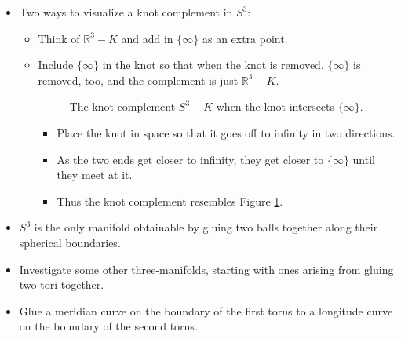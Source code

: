 \documentclass[titlepage]{article}
\numberwithin{figure}{section}
\numberwithin{table}{section}
\numberwithin{equation}{section}
\begin{document}
\begin{itemize}
    \item Two ways to visualize a knot complement in $S^3$:
    \begin{itemize}
        \item Think of $\mathbb{R}^3-K$ and add in $\{\infty\}$ as an extra point.
        \item Include $\{\infty\}$ in the knot so that when the knot is removed, $\{\infty\}$ is removed, too, and the complement is just $\mathbb{R}^3-K$.
        \begin{figure}[h!]
            \centering
            \caption{The knot complement $S^3-K$ when the knot intersects $\{\infty\}$.}
            \label{fig:knotinfty}
        \end{figure}
        \begin{itemize}
            \item Place the knot in space so that it goes off to infinity in two directions.
            \item As the two ends get closer to infinity, they get closer to $\{\infty\}$ until they meet at it.
            \item Thus the knot complement resembles Figure \ref{fig:knotinfty}.
        \end{itemize}
    \end{itemize}
    \item $S^3$ is the only manifold obtainable by gluing two balls together along their spherical boundaries.
    \item Investigate some other three-manifolds, starting with ones arising from gluing two tori together.
    \item Glue a meridian curve on the boundary of the first torus to a longitude curve on the boundary of the second torus.

\end{itemize}
\end{document}
